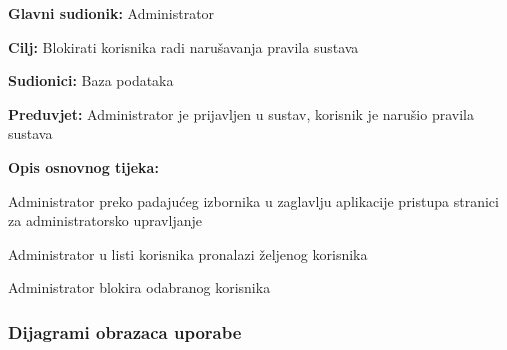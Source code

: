 					\noindent {}
					\begin{packed_item}
						
						\item \textbf{Glavni sudionik: } Administrator
						\item  \textbf{Cilj:} Blokirati korisnika radi narušavanja pravila sustava
						\item  \textbf{Sudionici:} Baza podataka
						\item  \textbf{Preduvjet:} Administrator je prijavljen u sustav, korisnik je narušio pravila sustava
						\item  \textbf{Opis osnovnog tijeka:}
						
						\item[] \begin{packed_enum}
							
							\item Administrator preko padajućeg izbornika u zaglavlju aplikacije pristupa stranici za administratorsko upravljanje
							\item Administrator u listi korisnika pronalazi željenog korisnika
							\item Administrator blokira odabranog korisnika
							
						\end{packed_enum}
					\end{packed_item}	
				\eject				
				\subsubsection{Dijagrami obrazaca uporabe}
					
